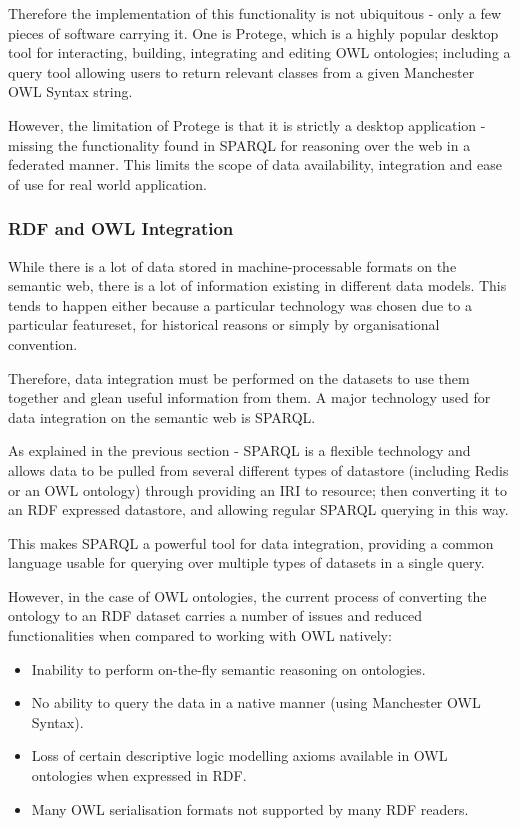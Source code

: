 \documentclass{article}
\begin{document}
Therefore the implementation of this functionality is not ubiquitous - only a
few pieces of software carrying it. One is Protege, which is a highly popular
desktop tool for interacting, building, integrating and editing OWL ontologies;
including a query tool allowing users to return relevant classes from a given
Manchester OWL Syntax string. 

However, the limitation of Protege is that it is strictly a desktop application
- missing the functionality found in SPARQL for reasoning over the web in a
federated manner. This limits the scope of data availability, integration and
ease of use for real world application. 

\subsubsection{RDF and OWL Integration}

While there is a lot of data stored in machine-processable formats on the semantic web, 
there is a lot of information existing in different data models. This 
tends to happen either because a particular technology was chosen due to 
a particular featureset, for historical reasons or simply by organisational convention.

Therefore, data integration must be performed on the datasets to use them
together and glean useful information from them. A major technology used for 
data integration on the semantic web is SPARQL.

As explained in the previous section - SPARQL is a flexible technology and allows 
data to be pulled from several different types of datastore (including Redis or an 
OWL ontology) through providing an IRI to resource; then converting it to an RDF 
expressed datastore, and allowing regular SPARQL querying in this way. 

This makes SPARQL a powerful tool for data integration, providing a common
language usable for querying over multiple types of datasets in a single query.

However, in the case of OWL ontologies, the current process of converting the
ontology to an RDF dataset carries a number of issues and reduced
functionalities when compared to working with OWL natively:

\begin{itemize}
  \item Inability to perform on-the-fly semantic reasoning on ontologies.
  \item No ability to query the data in a native manner (using Manchester OWL Syntax).
  \item Loss of certain descriptive logic modelling axioms available in OWL
  ontologies when expressed in RDF.
  \item Many OWL serialisation formats not supported by many RDF readers.
\end{itemize}
\end{document}
